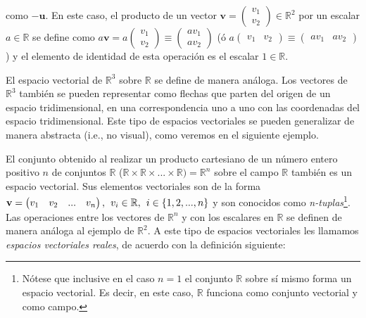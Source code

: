 \documentclass[apuntes]{subfiles}
\begin{document}
como $-\mathbf{u}$. En este caso, el producto de un vector $\textbf{v}=\begin{pmatrix}v_1\\v_2\end{pmatrix}\in\mathbb{R}^2$ por un escalar $a\in\mathbb{R}$ se define como $a\textbf{v}=a\begin{pmatrix}v_1\\v_2\end{pmatrix} \equiv \begin{pmatrix}av_1\\av_2\end{pmatrix}$ (ó $a\begin{pmatrix}v_1&v_2\end{pmatrix} \equiv \begin{pmatrix}av_1&av_2\end{pmatrix}$) y el elemento de identidad de esta operación es el escalar $1\in\mathbb{R}$.

\vspace{3mm}

El espacio vectorial de $\mathbb{R}^3$ sobre $\mathbb{R}$ se define de manera análoga. Los vectores de $\mathbb{R}^3$ también se pueden representar como flechas que parten del origen de un espacio tridimensional, en una correspondencia uno a uno con las coordenadas del espacio tridimensional. Este tipo de espacios vectoriales se pueden generalizar de manera abstracta (i.e., no visual), como veremos en el siguiente ejemplo.

\vspace{3mm}

El conjunto obtenido al realizar un producto cartesiano de un número entero positivo $n$ de conjuntos $\mathbb{R}$ ($\mathbb{R}\times\mathbb{R}\times...\times\mathbb{R}) = \mathbb{R}^n$ sobre el campo $\mathbb{R}$ también es un espacio vectorial. Sus elementos vectoriales son de la forma $\mathbf{v} = \begin{pmatrix}v_1&v_2& ... & v_n\end{pmatrix}, \hspace{1.5mm} v_i \in \mathbb{R}, \hspace{1.5mm} i \in \{1,2,...,n\}$ y son conocidos como \textit{n-tuplas}\footnote{Nótese que inclusive en el caso $n=1$ el conjunto $\mathbb{R}$ sobre sí mismo forma un espacio vectorial. Es decir, en este caso, $\mathbb{R}$ funciona como conjunto vectorial y como campo.}. Las operaciones entre los vectores de $\mathbb{R}^n$ y con los escalares en $\mathbb{R}$ se definen de manera análoga al ejemplo de $\mathbb{R}^2$. A este tipo de espacios vectoriales les llamamos \textit{espacios vectoriales reales}, de acuerdo con la definición siguiente:
\end{document}
